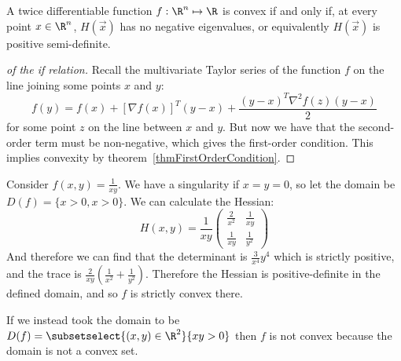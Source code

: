 \documentclass[../Main.tex]{subfiles}
\begin{document}
\begin{theorem}
    A twice differentiable function $f : \R^n \mapsto \R$ is convex if and only if, at every point $x \in \R^n$, $H(\vec{x})$ has no negative eigenvalues, or equivalently $H(\vec{x})$ is positive semi-definite.
    \label{thmSecondOrderCondition}
\end{theorem}
\begin{proof}[of the if relation]
    Recall the multivariate Taylor series of the function $f$ on the line joining some points $x$ and $y$:
    \begin{equation*}
        f(y) = f(x) + [\nabla f(x)]^T (y - x) + \frac{(y - x)^T \nabla^2 f(z) (y-x)}{2}
    \end{equation*}
    for some point $z$ on the line between $x$ and $y$. But now we have that the second-order term must be non-negative, which gives the first-order condition. This implies convexity by theorem~\ref{thmFirstOrderCondition}.
\end{proof}
\begin{example}
    Consider $f(x, y) = \frac{1}{xy}$. We have a singularity if $x = y = 0$, so let the domain be $D(f) = \{x > 0, x > 0\}$.
    We can calculate the Hessian:
    \begin{equation*}
        H(x, y) = \frac{1}{xy}
        \begin{pmatrix}
        \frac{2}{x^2} & \frac{1}{xy} \\
        \frac{1}{xy} & \frac{1}{y^2}
        \end{pmatrix}
    \end{equation*}
    And therefore we can find that the determinant is $\frac{3}{x^4}{y^4}$ which is strictly positive, and the trace is $\frac{2}{xy} \left(\frac{1}{x^2} + \frac{1}{y^2}\right)$. Therefore the Hessian is positive-definite in the defined domain, and so $f$ is strictly convex there.

    If we instead took the domain to be $D(f) = \subsetselect{(x, y) \in \R^2}{xy > 0}$ then $f$ is not convex because the domain is not a convex set.
\end{example}
\end{document}
